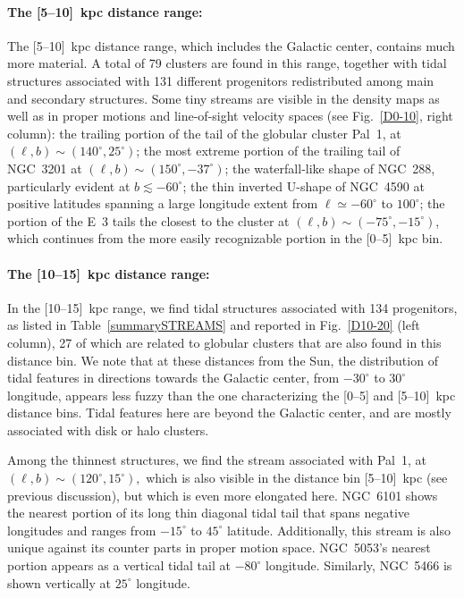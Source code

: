     \paragraph{The [5--10]~kpc distance range: }
    The [5--10]~kpc distance range, which includes the Galactic center, contains much more material. A total of 79 clusters are found in this range, together with tidal structures associated with 131 different progenitors redistributed among main and secondary structures. Some tiny streams are visible in the density maps as well as in proper motions and line-of-sight velocity spaces (see Fig.~\ref{D0-10}, right column): the trailing portion of the tail of the globular cluster Pal~1, at $(\ell, b)\sim(140^\circ, 25^\circ)$; the most extreme portion of the trailing tail of NGC~3201 at $(\ell, b)\sim(150^\circ, -37^\circ)$; the waterfall-like shape of NGC~288, particularly evident at $b \lesssim -60^{\circ}$; the thin inverted U-shape of NGC~4590 at positive latitudes spanning a large longitude extent from $\ell \simeq -60^\circ$ to $100^\circ$; the portion of the E~3 tails the closest to the cluster at $(\ell, b)\sim(-75^{\circ},-15^{\circ})$, which continues from the more easily recognizable portion in the [0--5]~kpc bin.

    \paragraph{The [10--15]~kpc distance range: }
    In the [10--15]~kpc range, we find tidal structures associated with 134 progenitors, as listed in Table~\ref{summarySTREAMS} and reported in Fig.~\ref{D10-20} (left column), 27 of which are related to globular clusters that are also found in this distance bin. We note that at these distances from the Sun, the distribution of tidal features in directions towards the Galactic center, from $-30^{\circ}$ to $30^{\circ}$ longitude, appears less fuzzy than the one characterizing the [0--5] and [5--10]~kpc distance bins. Tidal features here are beyond the Galactic center, and are mostly associated with disk or halo clusters. 

    Among the thinnest structures, we find the stream associated with Pal~1, at $(\ell, b)\sim(120^\circ, 15^\circ),$ which is also visible in the distance bin [5--10]~kpc (see previous discussion), but which is even more elongated here. NGC~6101 shows the nearest portion of its long thin diagonal tidal tail that spans negative longitudes and ranges from $-15^{\circ}$ to $45^\circ$ latitude. Additionally, this stream is also unique against its counter parts in proper motion space. NGC~5053's nearest portion appears as a vertical tidal tail at $-80^{\circ}$ longitude. Similarly, NGC~5466 is shown vertically at $25^{\circ}$ longitude.

